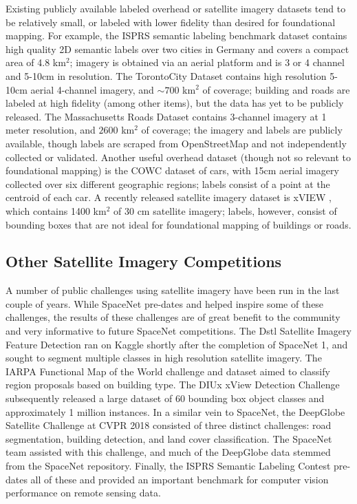 \documentclass{article}
\begin{document}
Existing publicly available labeled overhead or satellite imagery datasets tend to be relatively small, or labeled with lower fidelity than desired for foundational mapping.  For example, the ISPRS semantic labeling benchmark \cite{isprs_sem}
dataset contains high quality 2D semantic labels over two cities in Germany and covers a compact area of 4.8 km$^2$; 
imagery is obtained via an aerial platform and is 3 or 4 channel and  5-10cm in resolution.  The TorontoCity Dataset \cite{torontocity} contains high resolution 5-10cm aerial 4-channel imagery, and $\sim700$ km$^2$ of coverage; building and roads are labeled at high fidelity (among other items), but the data has yet to be publicly released.  The Massachusetts Roads Dataset \cite{MnihThesis} contains 3-channel imagery at 1 meter resolution, and $2600$ km$^2$ of coverage; the imagery and labels are publicly available, though labels are scraped from OpenStreetMap and not independently collected or validated. Another useful overhead dataset (though not so relevant to foundational mapping) is the COWC dataset \cite{cowc} of cars, with 15cm aerial imagery collected over six different geographic regions; labels consist of a point at the centroid of each car. A recently released satellite imagery dataset is xVIEW \cite{xview_data}, which contains 1400 km$^2$ of 30 cm satellite imagery; labels, however, consist of bounding boxes that are not ideal for foundational mapping of buildings or roads.  

\subsection{Other Satellite Imagery Competitions}
	A number of public challenges using satellite imagery have been run in the last couple of years.  While SpaceNet pre-dates and helped inspire some of these challenges, the results of these challenges are of great benefit to the community and very informative to future SpaceNet competitions.  
	The Dstl Satellite Imagery Feature Detection \cite{dstl} ran on Kaggle shortly after the completion of SpaceNet 1, and sought to segment multiple classes in high resolution satellite imagery.  
	The IARPA Functional Map of the World \cite{fmow} challenge and dataset aimed to classify region proposals based on building type. 
	The DIUx xView Detection Challenge \cite{xview} subsequently released a large dataset of 60 bounding box object classes and approximately 1 million instances.  
	In a similar vein to SpaceNet, the DeepGlobe Satellite Challenge at CVPR 2018 \cite{deepglobe} consisted of three distinct challenges: road segmentation, building detection, and land cover classification.  The SpaceNet team assisted with this challenge, and much of the DeepGlobe data stemmed from the SpaceNet repository.  Finally, the ISPRS Semantic Labeling Contest  \cite{isprssemlab} pre-dates all of these and provided an important benchmark for computer vision performance on remote sensing data.
	
\end{document}
